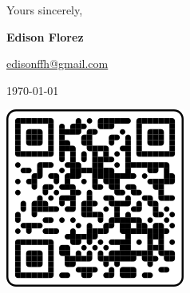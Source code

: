 \vfill
\begin{minipage}[c]{.75\textwidth}
    Yours sincerely,

    \vspace*{6mm}

    \textbf{Edison Florez}

    \href{mailto:edisonffh@gmail.com}{edisonffh@gmail.com}

    \today

\end{minipage}
\begin{minipage}[c]{.2\textwidth}
    \centering
    \href{
        https://github.com/e-florez/e-florez
    }{
        \includegraphics[scale=0.4]{figs/qrcode_github_page.png}
    }
\end{minipage}
